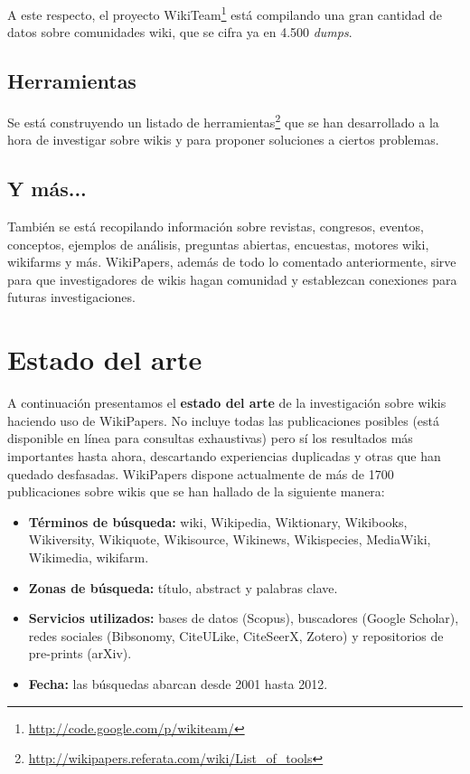 \documentclass[11pt,onecolumn]{article}
\begin{document}
A este respecto, el proyecto WikiTeam\footnote{\href{http://code.google.com/p/wikiteam/}{http://code.google.com/p/wikiteam/}} está compilando una gran cantidad de datos sobre comunidades wiki, que se cifra ya en 4.500 \emph{dumps}.

\subsection{Herramientas}
Se está construyendo un listado de herramientas\footnote{\href{http://wikipapers.referata.com/wiki/List_of_tools}{http://wikipapers.referata.com/wiki/List\_of\_tools}} que se han desarrollado a la hora de investigar sobre wikis y para proponer soluciones a ciertos problemas.

\subsection{Y más...}
También se está recopilando información sobre revistas, congresos, eventos, conceptos, ejemplos de análisis, preguntas abiertas, encuestas, motores wiki, wikifarms y más. WikiPapers, además de todo lo comentado anteriormente, sirve para que investigadores de wikis hagan comunidad y establezcan conexiones para futuras investigaciones.

\clearpage

\section{Estado del arte}


A continuación presentamos el \textbf{estado del arte} de la investigación sobre wikis haciendo uso de WikiPapers. No incluye todas las publicaciones posibles (está disponible en línea para consultas exhaustivas) pero sí los resultados más importantes hasta ahora, descartando experiencias duplicadas y otras que han quedado desfasadas. WikiPapers dispone actualmente de más de 1700 publicaciones sobre wikis que se han hallado de la siguiente manera:
\begin{itemize}
\item \textbf{Términos de búsqueda:}  wiki, Wikipedia, Wiktionary, Wikibooks, Wikiversity, Wikiquote, Wikisource, Wikinews, Wikispecies, MediaWiki, Wikimedia, wikifarm.
\item \textbf{Zonas de búsqueda:} título, abstract y palabras clave.
\item \textbf{Servicios utilizados:} bases de datos (Scopus), buscadores (Google Scholar), redes sociales (Bibsonomy, CiteULike, CiteSeerX, Zotero) y repositorios de pre-prints (arXiv).
\item \textbf{Fecha:} las búsquedas abarcan desde 2001 hasta 2012.
\end{itemize}
\end{document}
